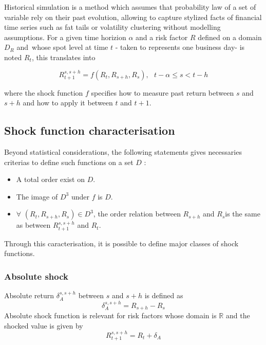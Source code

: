 \documentclass[10pt,a4paper]{report}
\begin{document}
Historical simulation is a method which assumes that probability law of a
set of variable rely on their past evolution, allowing to capture stylized
facts of financial time series such as fat tails or volatility clustering
without modelling assumptions. For a given time horizion $\alpha $ and a
risk factor $R$ defined on a domain $D_{R}$ and\ whose spot level at time $t$
- taken to represents one business day- is noted $R_{t}$, this translates
into

\begin{equation*}
R_{t+1}^{s,s+h}=f(R_{t},R_{s+h},R_{s}),\text{ \ \ }t-\alpha \leq s<t-h
\end{equation*}

where the shock function $f$ specifies how to measure past return between $s$
and $s+h$ and how to apply it between $t$ and $t+1$.


\subsection{Shock function characterisation}
Beyond statistical
considerations, the following statements gives necessaries criterias to
define such functions on a set $D$ :

\bigskip

\begin{itemize}
\item A total order exist on $D.$
\item The image of $D^{3}$ under $f$ is $D.$
\item $\forall $ $(R_{t},R_{s+h},R_{s})\in D^{3}$, the order relation
between $R_{s+h}$ and $R_{s}$is the same as between $R_{t+1}^{s,s+h}$ and $%
R_{t}.$
\end{itemize}

\bigskip 

Through this caracterisation, it is possible to define major classes of shock functions.

\subsubsection{Absolute shock}

Absolute return $\delta _{A}^{s,s+h}$ between $s$ and $s+h$ is defined as%
\begin{equation*}
\delta _{A}^{s,s+h}=R_{s+h}-R_{s}
\end{equation*}%
Absolute shock function is relevant for risk factors whose domain is $%
\mathbb{R}$ and the shocked value is given by 
\begin{equation*}
R_{t+1}^{s,s+h}=R_{t}+\delta _{A}
\end{equation*}
\end{document}
